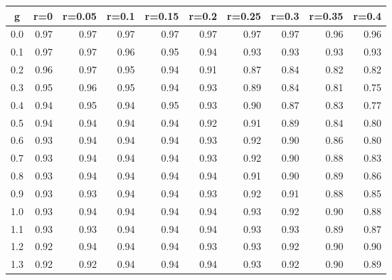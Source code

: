 %
\begin{table}[!tbp]
 \begin{center}
 \begin{tabular}{rrrrrrrrrr}\hline\hline
\multicolumn{1}{c}{g}&\multicolumn{1}{c}{r=0}&\multicolumn{1}{c}{r=0.05}&\multicolumn{1}{c}{r=0.1}&\multicolumn{1}{c}{r=0.15}&\multicolumn{1}{c}{r=0.2}&\multicolumn{1}{c}{r=0.25}&\multicolumn{1}{c}{r=0.3}&\multicolumn{1}{c}{r=0.35}&\multicolumn{1}{c}{r=0.4}\tabularnewline
\hline
0.0&0.97&0.97&0.97&0.97&0.97&0.97&0.97&0.96&0.96\tabularnewline
0.1&0.97&0.97&0.96&0.95&0.94&0.93&0.93&0.93&0.93\tabularnewline
0.2&0.96&0.97&0.95&0.94&0.91&0.87&0.84&0.82&0.82\tabularnewline
0.3&0.95&0.96&0.95&0.94&0.93&0.89&0.84&0.81&0.75\tabularnewline
0.4&0.94&0.95&0.94&0.95&0.93&0.90&0.87&0.83&0.77\tabularnewline
0.5&0.94&0.94&0.94&0.94&0.92&0.91&0.89&0.84&0.80\tabularnewline
0.6&0.93&0.94&0.94&0.94&0.93&0.92&0.90&0.86&0.80\tabularnewline
0.7&0.93&0.94&0.94&0.94&0.93&0.92&0.90&0.88&0.83\tabularnewline
0.8&0.93&0.94&0.94&0.94&0.94&0.91&0.90&0.89&0.86\tabularnewline
0.9&0.93&0.93&0.94&0.94&0.93&0.92&0.91&0.88&0.85\tabularnewline
1.0&0.93&0.94&0.94&0.94&0.94&0.93&0.92&0.90&0.88\tabularnewline
1.1&0.93&0.93&0.94&0.94&0.94&0.93&0.93&0.89&0.87\tabularnewline
1.2&0.92&0.94&0.94&0.94&0.93&0.93&0.92&0.90&0.90\tabularnewline
1.3&0.92&0.92&0.94&0.94&0.94&0.93&0.92&0.90&0.89\tabularnewline
\hline
\end{tabular}

\end{center}

\end{table}


